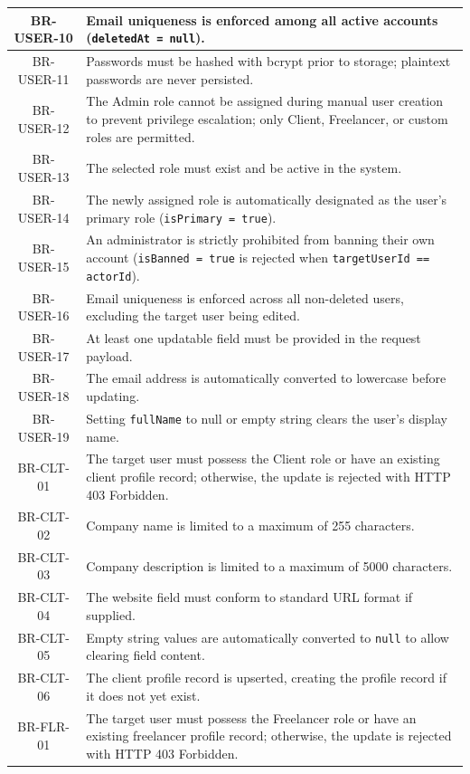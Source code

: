\begin{longtable}{|c|p{12cm}|}
    BR-USER-10 & Email uniqueness is enforced among all active accounts (\texttt{deletedAt = null}). \\ \hline
    BR-USER-11 & Passwords must be hashed with bcrypt prior to storage; plaintext passwords are never persisted. \\ \hline
    BR-USER-12 & The Admin role cannot be assigned during manual user creation to prevent privilege escalation; only Client, Freelancer, or custom roles are permitted. \\ \hline
    BR-USER-13 & The selected role must exist and be active in the system. \\ \hline
    BR-USER-14 & The newly assigned role is automatically designated as the user's primary role (\texttt{isPrimary = true}). \\ \hline
    BR-USER-15 & An administrator is strictly prohibited from banning their own account (\texttt{isBanned = true} is rejected when \texttt{targetUserId == actorId}). \\ \hline
    BR-USER-16 & Email uniqueness is enforced across all non-deleted users, excluding the target user being edited. \\ \hline
    BR-USER-17 & At least one updatable field must be provided in the request payload. \\ \hline
    BR-USER-18 & The email address is automatically converted to lowercase before updating. \\ \hline
    BR-USER-19 & Setting \texttt{fullName} to null or empty string clears the user's display name. \\ \hline
    BR-CLT-01 & The target user must possess the Client role or have an existing client profile record; otherwise, the update is rejected with HTTP 403 Forbidden. \\ \hline
    BR-CLT-02 & Company name is limited to a maximum of 255 characters. \\ \hline
    BR-CLT-03 & Company description is limited to a maximum of 5000 characters. \\ \hline
    BR-CLT-04 & The website field must conform to standard URL format if supplied. \\ \hline
    BR-CLT-05 & Empty string values are automatically converted to \texttt{null} to allow clearing field content. \\ \hline
    BR-CLT-06 & The client profile record is upserted, creating the profile record if it does not yet exist. \\ \hline
    BR-FLR-01 & The target user must possess the Freelancer role or have an existing freelancer profile record; otherwise, the update is rejected with HTTP 403 Forbidden. \\ \hline

\end{longtable}
